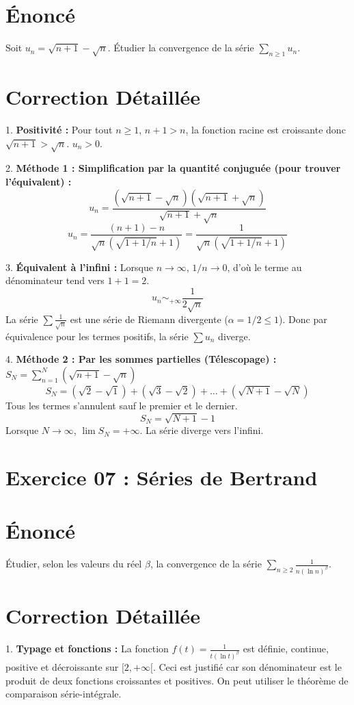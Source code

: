 \documentclass[12pt, a4paper]{article}
\begin{document}
\section{Énoncé}
Soit $u_n = \sqrt{n+1} - \sqrt{n}$. Étudier la convergence de la série $\sum_{n \ge 1} u_n$.

\section{Correction Détaillée}
1. \textbf{Positivité :}
   Pour tout $n \ge 1$, $n+1 > n$, la fonction racine est croissante donc $\sqrt{n+1} > \sqrt{n}$. $u_n > 0$.

2. \textbf{Méthode 1 : Simplification par la quantité conjuguée (pour trouver l'équivalent) :}
   $$u_n = \frac{(\sqrt{n+1} - \sqrt{n})(\sqrt{n+1} + \sqrt{n})}{\sqrt{n+1} + \sqrt{n}}$$
   $$u_n = \frac{(n+1) - n}{\sqrt{n} (\sqrt{1+1/n} + 1)} = \frac{1}{\sqrt{n} (\sqrt{1+1/n} + 1)}$$

3. \textbf{Équivalent à l'infini :}
   Lorsque $n \to \infty$, $1/n \to 0$, d'où le terme au dénominateur tend vers $1 + 1 = 2$.
   $$u_n \sim_{+\infty} \frac{1}{2\sqrt{n}}$$
   La série $\sum \frac{1}{\sqrt{n}}$ est une série de Riemann divergente ($\alpha = 1/2 \le 1$). Donc par équivalence pour les termes positifs, la série $\sum u_n$ diverge.

4. \textbf{Méthode 2 : Par les sommes partielles (Télescopage) :}
   $S_N = \sum_{n=1}^N (\sqrt{n+1} - \sqrt{n})$
   $$S_N = (\sqrt{2} - \sqrt{1}) + (\sqrt{3} - \sqrt{2}) + \dots + (\sqrt{N+1} - \sqrt{N})$$
   Tous les termes s'annulent sauf le premier et le dernier.
   $$S_N = \sqrt{N+1} - 1$$
   Lorsque $N \to \infty$, $\lim S_N = +\infty$. La série diverge vers l'infini.


\section*{Exercice 07 : Séries de Bertrand}

\section{Énoncé}
Étudier, selon les valeurs du réel $\beta$, la convergence de la série $\sum_{n \ge 2} \frac{1}{n (\ln n)^\beta}$.

\section{Correction Détaillée}
1. \textbf{Typage et fonctions :}
   La fonction $f(t) = \frac{1}{t (\ln t)^\beta}$ est définie, continue, positive et décroissante sur $[2, +\infty[$.
   Ceci est justifié car son dénominateur est le produit de deux fonctions croissantes et positives. On peut utiliser le théorème de comparaison série-intégrale.
\end{document}
